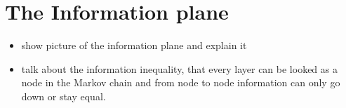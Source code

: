 \section{The Information plane}


\begin{itemize}
  \item{
      show picture of the information plane and explain it
    }
  \item{
      talk about the information inequality, that every layer can be looked as a
      node in the Markov chain and from node to node information can only go
      down or stay equal.
    }
\end{itemize}
